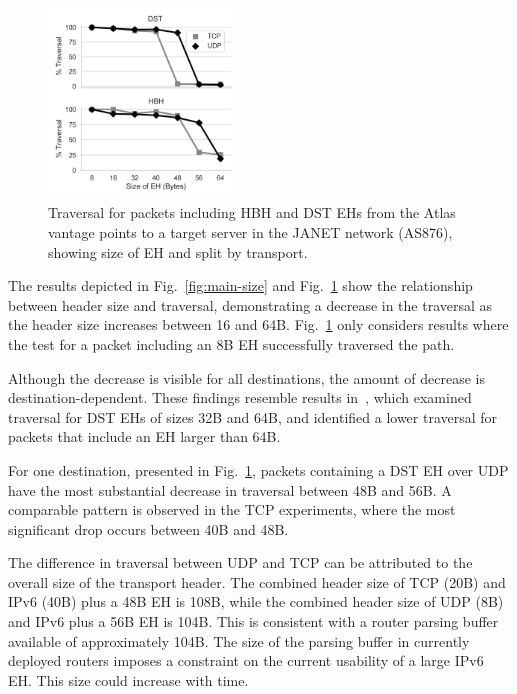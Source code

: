 \documentclass[conference]{IEEEtran}
\begin{document}
\begin{figure}[t]
\centering
  \includegraphics[width=0.45\textwidth]{sizes.png}
  \caption{Traversal for packets including HBH and DST EHs from the Atlas
vantage points to a target server in the JANET network (AS876), showing
size of EH and split by transport.  }

  \label{fig:sizes}
\end{figure}



The results depicted in Fig.~\ref{fig:main-size} and Fig.~\ref{fig:sizes} show the relationship between
header size and traversal, demonstrating a decrease in the traversal as the header size increases between 16 and 64B. 
Fig.~\ref{fig:sizes} only considers results where the test for a packet including an 8B EH successfully traversed the path.


Although the decrease is visible for all destinations, the amount of decrease is destination-dependent. These findings
resemble results in~\cite{james-imc}, which examined traversal
 for DST EHs of sizes 32B and 64B, and identified a lower traversal for
packets that include an EH larger than 64B.

For one destination, presented in Fig.~\ref{fig:sizes}, packets containing a DST EH over UDP have the
most substantial decrease in traversal between 48B and 56B. A
comparable pattern is observed in the TCP experiments, where the most significant drop occurs between 40B and 48B. 


The difference in traversal between UDP and TCP can be attributed to the overall
size of the transport header.  The combined header size of TCP (20B) and IPv6
(40B) plus a 48B EH is 108B, while the combined header size of UDP (8B) and IPv6
plus a 56B EH is 104B. 
This is consistent with a router parsing buffer available of approximately 104B.
The size of the parsing buffer in currently deployed routers imposes a
constraint on the current usability of a large IPv6 EH. This size could increase with time.
\end{document}
